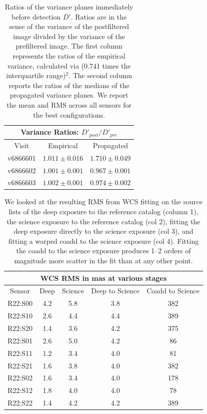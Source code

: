 \documentclass[prd, nofootinbib, floatfix, 11pt,tightenlines,times]{article}
\begin{document}
\begin{table}
\centering
\begin{tabular}{ccc}
\hline
\multicolumn{3}{|c|}{Variance Ratios: $D'_{post} / D'_{pre}$} \\
\hline
Visit    & Empirical & Propagated \\
\hline
v6866601 & $1.011 \pm 0.016$    & $1.710 \pm 0.049$    \\
v6866602 & $1.001 \pm 0.001$    & $0.967 \pm 0.001$    \\
v6866603 & $1.002 \pm 0.001$    & $0.974 \pm 0.002$    \\
\end{tabular}
\caption{Ratios of the variance planes immediately before detection
  $D'$.  Ratios are in the sense of the variance of the postfiltered
  image divided by the variance of the prefiltered image.  The first
  column represents the ratios of the empirical variance, calculated
  via (0.741 times the interquartile range)$^2$.  The second column
  reports the ratios of the medians of the propagated variance planes.
  We report the mean and RMS across all sensors for the best
  configurations.}
\label{tab-variance2}
\end{table}


\clearpage
\begin{table}
\centering
\begin{tabular}{|c|c|c|c|c|}
\hline
\multicolumn{5}{|c|}{WCS RMS in mas at various stages} \\
\hline
Sensor    & Deep & Science &  Deep to Science & Coadd to Science \\
\hline
R22:S00&4.2&5.8&3.8&382\\ 
R22:S10&2.6&4.4&4.4&389\\
R22:S20&1.4&3.6&4.2&375\\
R22:S01&2.6&5.0&4.2&86\\
R22:S11&1.2&3.4&4.0&81\\
R22:S21&1.6&3.8&4.0&382\\
R22:S02&1.6&3.4&4.0&178\\
R22:S12&1.8&4.0&4.0&78\\
R22:S22&1.4&4.2&4.2&389\\
\hline
\end{tabular}
\caption{We looked at the resulting RMS from WCS fitting on the source lists of the deep exposure to the 
reference catalog (column 1), the science exposure to the reference catalog (col 2),
fitting the deep exposure directly to the science exposure (col 3), and fitting a warped coadd to the science exposure (col 4).  
Fitting the coadd to the science exposure produces 1--2 orders of magnitude more scatter in the fit than at any other 
point. \label{tab-wcsrms}}
\end{table}
\clearpage
\end{document}
